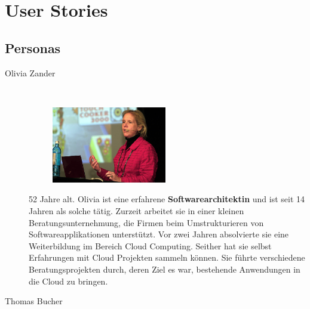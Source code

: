 \section{User Stories}
	\subsection{Personas}
		\begin{description}
			\item[Olivia Zander]\label{olivia}\ \newline
				\begin{minipage}[t]{0.35\textwidth} 
					\begin{figure}[H]
						\vspace{-0.75cm}
						\includegraphics[trim=0cm 0cm 0cm 0cm, clip=true, width=5cm]{requirements/media/img/oliviaZander.jpg}
						\caption[Symbolbild Persona Olivia Zander\newline 
						]
						{\label{Olivia Zander}}
					\end{figure}
				\end{minipage}
				\begin{minipage}[t]{0.55\textwidth}
					52 Jahre alt.
					Olivia ist eine erfahrene \textbf{Softwarearchitektin} 
					und ist seit 14 Jahren als solche tätig.
					Zurzeit arbeitet sie in einer kleinen Beratungsunternehmung, 
					die Firmen beim Umstrukturieren von Softwareapplikationen unterstützt.
					Vor zwei Jahren absolvierte sie eine Weiterbildung im Bereich Cloud Computing.
					Seither hat sie selbst Erfahrungen mit Cloud Projekten sammeln können. 
					Sie führte verschiedene Beratungsprojekten durch, deren Ziel es war,
					bestehende Anwendungen in die Cloud zu bringen.
				\end{minipage}
			\item[Thomas Bucher]\label{thomas}\ \newline
				\begin{minipage}[t]{0.35\textwidth} 
					\begin{figure}[H]
						\vspace{-0.75cm}

\end{figure}
\end{minipage}
\end{description}
